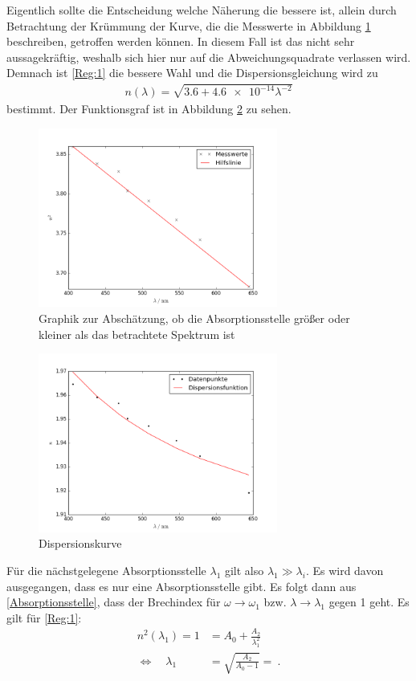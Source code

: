Eigentlich sollte die Entscheidung welche Näherung die bessere ist, allein durch Betrachtung der Krümmung der Kurve, die die Messwerte in Abbildung \ref{Abb:Krummung} beschreiben, getroffen werden können. In diesem Fall ist das nicht sehr aussagekräftig, weshalb sich hier nur auf die Abweichungsquadrate verlassen wird. Demnach ist \eqref{Reg:1} die bessere Wahl und die Dispersionsgleichung wird zu
\begin{align*}
	n(\lambda) = \sqrt{3.6 + \SI{4.6e-14}\lambda^{-2}}
\end{align*}
bestimmt. Der Funktionsgraf ist in Abbildung \ref{fig:DispKurve} zu sehen.
\begin{figure}[h!]
	\centering
	\includegraphics[width=0.7\textwidth]{Tendenz.png}
	\caption{Graphik zur Abschätzung, ob die Absorptionsstelle größer oder kleiner als das betrachtete Spektrum ist}
	\label{Abb:Krummung}
\end{figure}
\begin{figure}[h!]
	\centering
	\includegraphics[width=0.7\textwidth]{Dispersionskurve.png}
	\caption{Dispersionskurve}
	\label{fig:DispKurve}
\end{figure}
\newline
Für die nächstgelegene Absorptionsstelle $\lambda_1$ gilt also $\lambda_1\gg\lambda_i$. Es wird davon ausgegangen, dass es nur eine Absorptionsstelle gibt. Es folgt dann aus \eqref{Absorptionsstelle}, dass der Brechindex für $\omega\rightarrow\omega_1$ bzw. $\lambda\rightarrow\lambda_1$ gegen 1 geht. Es gilt für \eqref{Reg:1}:
\begin{align*}
	n^2(\lambda_1) = 1 &= A_0 + \frac{A_2}{\lambda_1^2} \\
	\Leftrightarrow\quad \lambda_1 &= \sqrt{\frac{A_2}{A_0-1}} =  \ .
\end{align*}
\clearpage
